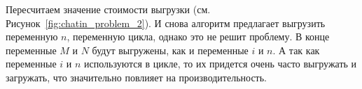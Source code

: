 Пересчитаем значение стоимости выгрузки (см. Рисунок~\ref{fig:chatin_problem_2}). И снова алгоритм предлагает
выгрузить переменную $n$, переменную цикла, однако это не решит проблему.
В конце переменные $M$ и $N$ будут выгружены, как и переменные $i$ и $n$.
А так как переменные $i$ и $n$ используются в цикле, то их придется очень часто выгружать и загружать, что
значительно повлияет на производительность.